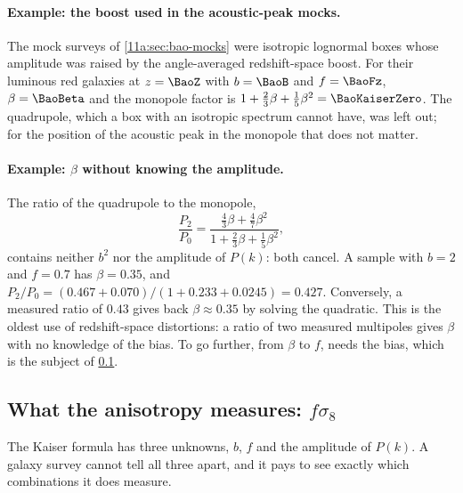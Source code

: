 \paragraph{Example: the boost used in the acoustic-peak mocks.}
The mock surveys of \cref{11a:sec:bao-mocks} were isotropic lognormal boxes
whose amplitude was raised by the angle-averaged redshift-space boost. For their
luminous red galaxies at $z=\BaoZ$ with $b=\BaoB$ and $f=\BaoFz$, $\beta=\BaoBeta$
and the monopole factor is $1+\frac23\beta+\frac15\beta^2=\BaoKaiserZero$. The
quadrupole, which a box with an isotropic spectrum cannot have, was left out;
for the position of the acoustic peak in the monopole that does not matter.

\paragraph{Example: $\beta$ without knowing the amplitude.}
The ratio of the quadrupole to the monopole,
\begin{equation}
  \frac{P_2}{P_0}=\frac{\frac43\beta+\frac47\beta^2}{1+\frac23\beta+\frac15\beta^2},
  \label{11a:eq:p2p0}
\end{equation}
contains neither $b^2$ nor the amplitude of $P(k)$: both cancel. A sample with
$b=2$ and $f=0.7$ has $\beta=0.35$, and
$P_2/P_0=(0.467+0.070)/(1+0.233+0.0245)=0.427$. Conversely, a measured ratio of
$0.43$ gives back $\beta\approx0.35$ by solving the quadratic. This is the
oldest use of redshift-space distortions: a ratio of two measured multipoles
gives $\beta$ with no knowledge of the bias. To go further, from $\beta$ to $f$,
needs the bias, which is the subject of \cref{11a:sec:fsigma8}.

\subsection{What the anisotropy measures: \texorpdfstring{$f\sigma_8$}{f sigma8}}
\label{11a:sec:fsigma8}

The Kaiser formula has three unknowns, $b$, $f$ and the amplitude of $P(k)$. A
galaxy survey cannot tell all three apart, and it pays to see exactly which
combinations it does measure.

